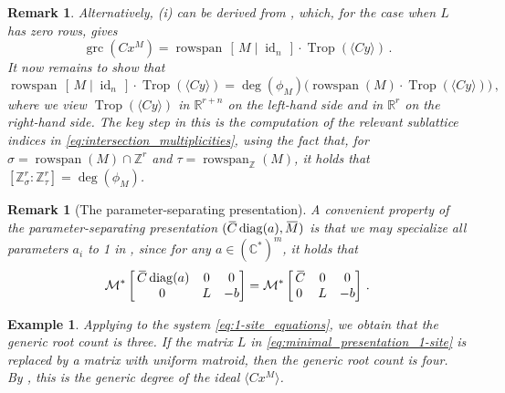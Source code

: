 \documentclass[11pt,reqno,a4paper]{amsart}
\numberwithin{equation}{section}
\theoremstyle{theoremstyle}
\theoremstyle{examplestyle}
\newtheorem{example}[theorem]{Example}
\newtheorem{remark}[theorem]{Remark}
\newcommand{\CC}{\mathbb{C}}
\newcommand{\RR}{\mathbb{R}}
\newcommand{\ZZ}{\mathbb{Z}}
\DeclareMathOperator{\grc}{grc}
\DeclareMathOperator{\rowspan}{rowspan}
\DeclareMathOperator{\id}{id}
\DeclareMathOperator{\diag}{diag}
\DeclareMathOperator{\Trop}{Trop}
\newcommand{\overbar}[1]{\mkern 2.5mu\overline{\mkern-2.5mu#1\mkern-1.5mu}\mkern 1.5mu}
\begin{document}
\begin{remark}
Alternatively, (i) can be derived from , which, for the case when $L$ has zero rows, gives 
\[\grc(C  x^M )= \rowspan\,[\,M\mid \id_n\,]   \cdot \Trop(\langle Cy \rangle)\,.\]
It now remains  to show that
\[  \rowspan\,[\,M\mid \id_n\,]  \cdot \Trop(\langle Cy \rangle) =\deg(\phi_M) \big(\rowspan(M)\cdot \Trop(\langle Cy \rangle)\big)\,,\]
where we view $\Trop(\langle Cy \rangle)$  in $\RR^{r+n}$ on the left-hand side and in $\RR^r$ on the right-hand side. 
The key step in this is the computation of the relevant sublattice indices in \eqref{eq:intersection_multiplicities},
using the fact that, for $\sigma=\rowspan(M) \cap \ZZ^{r}$ and $\tau=\rowspan_\ZZ(M)$, it holds that
$[\ZZ^{r}_{\sigma} : \ZZ^{r}_{\tau}]  = \deg(\phi_M)$.
 \end{remark}



\begin{remark}[The parameter-separating presentation]\label{rem:vertical}
A convenient property of the parameter-separating presentation $(\overbar{C}\diag(a),\overbar{M})$ is that we may specialize all parameters $a_i$ to 1 in , since for any $a\in(\CC^*)^m$, it holds that
\[\mathcal{M}^*\begin{bmatrix}
    \, \overbar{C} \diag(a) & 0 & 0 \\
    0 & L & -b
\end{bmatrix}=\mathcal{M}^*\begin{bmatrix}
    \, \overbar{C} & 0 & 0 \\
    0 & L & -b
\end{bmatrix}\, . \]
\end{remark}

\begin{example}\label{ex:running_grc}
Applying  to the system \eqref{eq:1-site_equations}, we obtain that the generic root count is three. If the matrix $L$ in \eqref{eq:minimal_presentation_1-site} is replaced by a matrix with uniform matroid, then  the generic root count is four. By , this is the generic degree of the ideal $\langle C x^M\rangle$.
\end{example}
\end{document}
